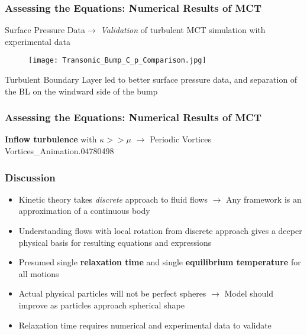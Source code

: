 \documentclass{beamer}
\begin{document}
\begin{frame}
\frametitle{Assessing the Equations: Numerical Results of MCT}
Surface Pressure Data\pause $\rightarrow$ \textit{Validation} of turbulent MCT 
simulation with experimental data
\begin{figure}
 \centering
  \texttt{[image: Transonic\_Bump\_C\_p\_Comparison.jpg]}
\end{figure}
\pause
Turbulent Boundary Layer led to better surface pressure data, and separation of 
the BL on the windward side of the bump
\end{frame}

\begin{frame}
 \frametitle{Assessing the Equations: Numerical Results of MCT}
 \Large
\textbf{Inflow turbulence} with $\kappa >> \mu$ $\rightarrow$ Periodic Vortices
{Vortices_Animation.}{0478}{0498}
\end{frame}

\begin{frame}
 \frametitle{Discussion}
 \large
 \begin{itemize}
  \item Kinetic theory takes \textit{discrete} approach to fluid flows \pause
$\rightarrow$ Any framework is an approximation of a continuous body
\pause
\item Understanding flows with local rotation from discrete approach gives a 
deeper physical basis for resulting equations and expressions
\pause
\item Presumed single \textbf{relaxation time} and single \textbf{equilibrium 
temperature} for all motions
\pause
\item Actual physical particles will not be perfect spheres \pause 
$\rightarrow$ Model should improve as particles approach spherical shape
\pause
\pause
\item Relaxation time requires numerical and experimental data to validate 
 \end{itemize}

\end{frame}
\end{document}
